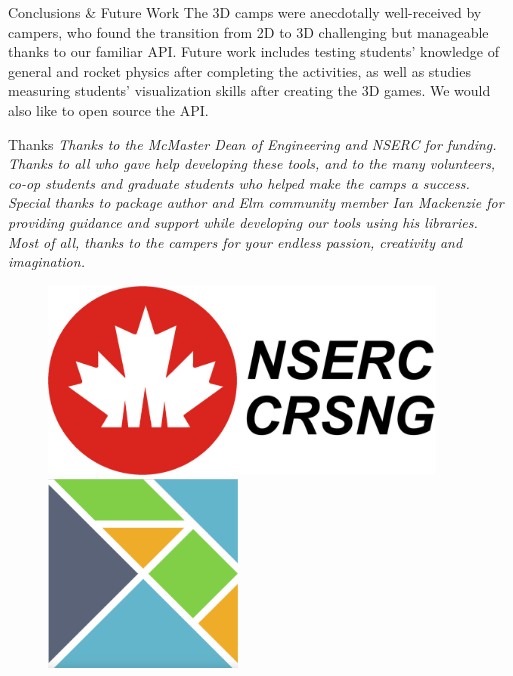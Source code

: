 \documentclass[22pt]{beamer}
\begin{document}
\begin{frame}[fragile]
\begin{textblock}{7.25}
\begin{block}{Conclusions \& Future Work}
The 3D camps were anecdotally well-received by campers, who found the transition from 2D to 3D challenging
but manageable thanks to our familiar API. Future work includes testing students' knowledge of
general and rocket physics after completing the activities, as well as studies measuring students'
visualization skills after creating the 3D games. We would also like to open source the API.

\end{block}

\begin{block}{Thanks}
\footnotesize{\textit{Thanks to the McMaster Dean of Engineering and NSERC for funding. Thanks to all who gave help developing these tools, and to the many volunteers, co-op students and graduate students who helped make the camps a success. Special thanks to package author and Elm community member Ian 
Mackenzie for providing guidance and support while developing our tools using his libraries. Most of all, thanks to the campers for your endless passion, creativity and imagination.}}
\end{block}


\begin{figure}[htbp]
\centering
\includegraphics[height=5cm]{nserc-logo.jpg}
\hspace{1cm}
\includegraphics[height=5cm]{elm-logo.png}

\end{figure}
\end{textblock}




\end{frame}
\end{document}
